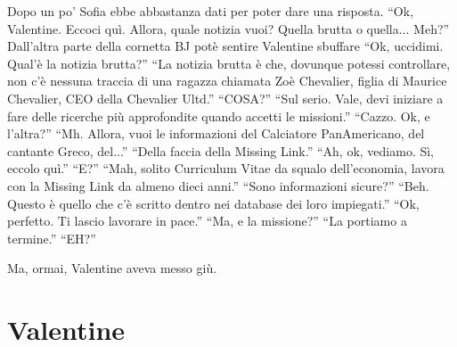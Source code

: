     Dopo un po' Sofia ebbe abbastanza dati per poter dare una risposta. ``Ok, Valentine. Eccoci quì. Allora, quale
    notizia vuoi? Quella brutta o quella... Meh?'' Dall'altra parte della cornetta BJ potè sentire Valentine sbuffare
    ``Ok, uccidimi. Qual'è la notizia brutta?'' ``La notizia brutta è che, dovunque potessi controllare, non c'è nessuna
    traccia di una ragazza chiamata Zoè Chevalier, figlia di Maurice Chevalier, CEO della Chevalier Ultd.'' ``COSA?''
    ``Sul serio. Vale, devi iniziare a fare delle ricerche più approfondite quando accetti le missioni.'' ``Cazzo. Ok, e
    l'altra?'' ``Mh. Allora, vuoi le informazioni del Calciatore PanAmericano, del cantante Greco, del...'' ``Della
    faccia della Missing Link.'' ``Ah, ok, vediamo. Sì, eccolo quì.'' ``E?'' ``Mah, solito Curriculum Vitae da squalo
    dell'economia, lavora con la Missing Link da almeno dieci anni.'' ``Sono informazioni sicure?'' ``Beh. Questo è
    quello che c'è scritto dentro nei database dei loro impiegati.'' ``Ok, perfetto. Ti lascio lavorare in pace.'' ``Ma,
    e la missione?'' ``La portiamo a termine.'' ``EH?''

    Ma, ormai, Valentine aveva messo giù.

  \section*{Valentine}


